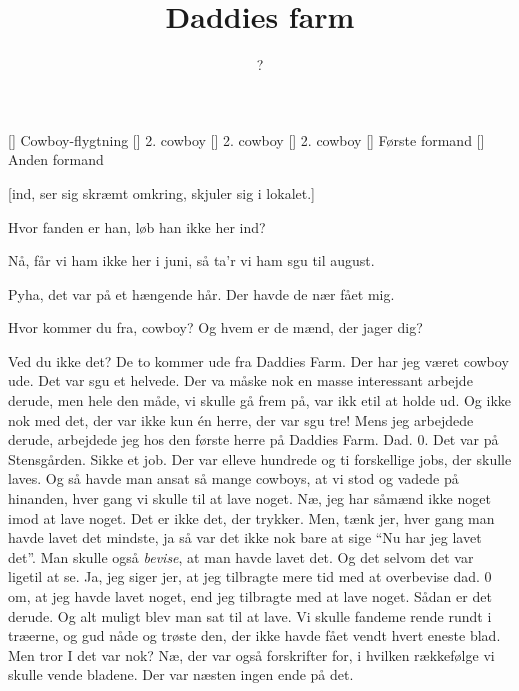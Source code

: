 \documentclass[a4paper,11pt]{article}
\title{Daddies farm}
\author{?}
\begin{document}
\maketitle

\begin{roles}
[] Cowboy-flygtning
[] 2. cowboy
[] 2. cowboy
[] 2. cowboy
[] Første formand
[] Anden formand
\end{roles}

\begin{sketch}


[ind, ser sig skræmt omkring, skjuler sig i lokalet.]

 Hvor fanden er han, løb han ikke her ind?


 Nå, får vi ham ikke her i juni, så ta'r vi ham sgu til august.


 Pyha, det var på et hængende hår.  Der havde de nær fået mig.

 Hvor kommer du fra, cowboy?  Og hvem er de mænd, der jager dig?

 Ved du ikke det?  De to kommer ude fra Daddies Farm.  Der har
jeg været cowboy ude.  Det var sgu et helvede.  Der va måske nok en
masse interessant arbejde derude, men hele den måde, vi skulle gå frem
på, var ikk etil at holde ud.  Og ikke nok med det, der var ikke kun
én herre, der var sgu tre!  Mens jeg arbejdede derude, arbejdede jeg
hos den første herre på Daddies Farm.  Dad. 0.  Det var på
Stensgården.  Sikke et job.  Der var elleve hundrede og ti forskellige
jobs, der skulle laves.  Og så havde man ansat så mange cowboys, at vi
stod og vadede på hinanden, hver gang vi skulle til at lave noget.
Næ, jeg har såmænd ikke noget imod at lave noget.  Det er ikke det,
der trykker.  Men, tænk jer, hver gang man havde lavet det mindste, ja
så var det ikke nok bare at sige "`Nu har jeg lavet det"'.  Man skulle
også {\em bevise}, at man havde lavet det.  Og det selvom det var
ligetil at se.  Ja, jeg siger jer, at jeg tilbragte mere tid med at
overbevise dad. 0 om, at jeg havde lavet noget, end jeg tilbragte med
at lave noget.  Sådan er det derude.  Og alt muligt blev man sat til
at lave.  Vi skulle fandeme rende rundt i træerne, og gud nåde og
trøste den, der ikke havde fået vendt hvert eneste blad.  Men tror I
det var nok?  Næ, der var også forskrifter for, i hvilken rækkefølge
vi skulle vende bladene.  Der var næsten ingen ende på det.


\end{sketch}
\end{document}
